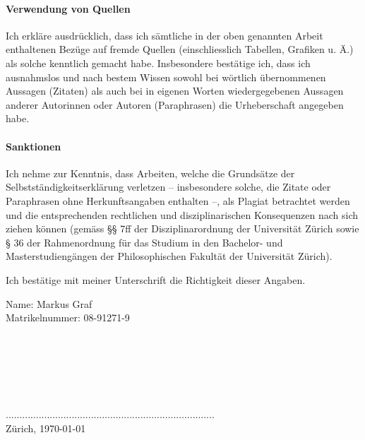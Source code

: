 \documentclass[english,12pt,doc]{apa}
\begin{document}
\paragraph{Verwendung von Quellen} 
Ich erkläre ausdrücklich, dass ich sämtliche in der oben genannten Arbeit enthaltenen Bezüge auf fremde Quellen (einschliesslich Tabellen, Grafiken u. Ä.) als solche kenntlich gemacht habe. Insbesondere bestätige ich, dass ich ausnahmslos und nach bestem Wissen sowohl bei wörtlich übernommenen Aussagen (Zitaten) als auch bei in eigenen Worten wiedergegebenen Aussagen anderer Autorinnen oder Autoren (Paraphrasen) die Urheberschaft angegeben habe. 

\paragraph{Sanktionen}
Ich nehme zur Kenntnis, dass Arbeiten, welche die Grundsätze der 
Selbstständigkeitserklärung verletzen – insbesondere solche, die Zitate oder Paraphrasen ohne Herkunftsangaben enthalten –, als Plagiat betrachtet werden und die entsprechenden rechtlichen und disziplinarischen Konsequenzen nach sich ziehen können (gemäss §§ 7ff der Disziplinarordnung der Universität Zürich sowie § 36 der Rahmenordnung für das Studium in den Bachelor- und Masterstudiengängen der Philosophischen Fakultät der Universität Zürich). 

Ich bestätige mit meiner Unterschrift die Richtigkeit dieser Angaben.

Name: Markus Graf\\
Matrikelnummer:  08-91271-9\\
\\
\\
\\
\\
\\
\\
............................................................................\\
Zürich, \today
\end{document}
